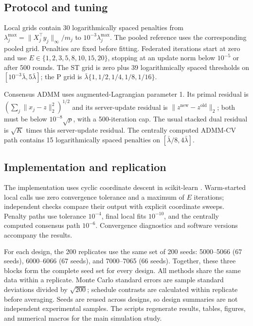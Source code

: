 \subsection{Protocol and tuning}

Local grids contain 30 logarithmically spaced penalties from
$\lambda_j^{\max}=\|X_j^\top y_j\|_\infty/m_j$ to
$10^{-3}\lambda_j^{\max}$. The pooled reference uses the corresponding
pooled grid. Penalties are fixed before fitting. Federated iterations
start at zero and use $E\in\{1,2,3,5,8,10,15,20\}$, stopping at an
update norm below $10^{-5}$ or after 500 rounds. The ST grid is zero
plus 39 logarithmically spaced thresholds on
$[10^{-3}\bar\lambda,5\bar\lambda]$; the P grid is
$\bar\lambda\{1,1/2,1/4,1/8,1/16\}$.

Consensus ADMM uses augmented-Lagrangian parameter 1. Its primal residual
is $(\sum_j\|x_j-z\|_2^2)^{1/2}$ and its server-update residual is
$\|z^{\mathrm{new}}-z^{\mathrm{old}}\|_2$; both must be below
$10^{-8}\sqrt p$, with a 500-iteration cap. The usual stacked dual
residual is $\sqrt K$ times this server-update residual. The centrally
computed ADMM-CV path contains 15 logarithmically spaced penalties on
$[\bar\lambda/8,4\bar\lambda]$.

\subsection{Implementation and replication}

The implementation uses cyclic coordinate descent in scikit-learn
\citep{pedregosa2011}. Warm-started local calls use zero convergence
tolerance and a maximum of $E$ iterations; independent checks compare
their output with explicit coordinate sweeps. Penalty paths use tolerance
$10^{-4}$, final local fits $10^{-10}$, and the centrally computed
consensus path $10^{-6}$. Convergence diagnostics and software versions
accompany the results.

For each design, the 200 replicates use the same set of 200 seeds:
5000--5066 (67 seeds), 6000--6066 (67 seeds), and 7000--7065 (66 seeds).
Together, these three blocks form the complete seed set for every design.
All methods share the same data within a replicate.
Monte Carlo standard errors are sample standard deviations divided by
$\sqrt{200}$; schedule contrasts are calculated within replicate before
averaging. Seeds are reused across designs, so design summaries are not
independent experimental samples. The scripts regenerate results, tables,
figures, and numerical macros for the main simulation study.
